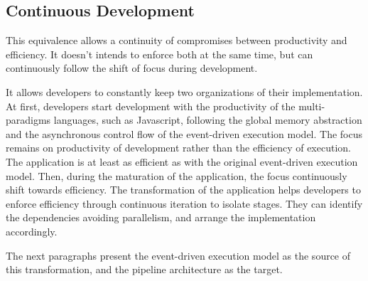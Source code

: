 \subsection{Continuous Development}

This equivalence allows a continuity of compromises between productivity and efficiency.
It doesn't intends to enforce both at the same time, but can continuously follow the shift of focus during development.

It allows developers to constantly keep two organizations of their implementation. %
At first, developers start development with the productivity of the multi-paradigms languages, such as Javascript, following the global memory abstraction and the asynchronous control flow of the event-driven execution model.
The focus remains on productivity of development rather than the efficiency of execution.
The application is at least as efficient as with the original event-driven execution model.
Then, during the maturation of the application, the focus continuously shift towards efficiency.
The transformation of the application helps developers to enforce efficiency through continuous iteration to isolate stages.
They can identify the dependencies avoiding parallelism, and arrange the implementation accordingly.

The next paragraphs present the event-driven execution model as the source of this transformation, and the pipeline architecture as the target.